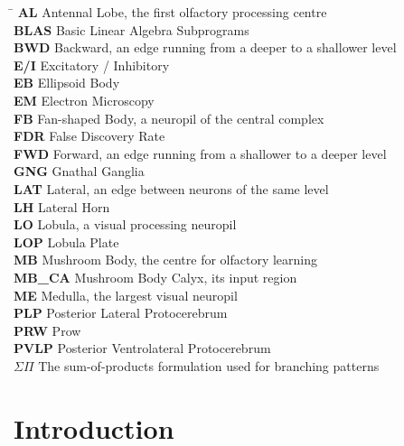 \documentclass[12pt,a4paper,oneside]{article}
\theoremstyle{definition}
\theoremstyle{plain}
\newcommand{\sigmapi}{\ensuremath{\Sigma\Pi}}
\begin{document}
\begin{tabbing}
\hspace{2.5cm}\= \kill
\textbf{AL}      \> Antennal Lobe, the first olfactory processing centre \\
\textbf{BLAS}    \> Basic Linear Algebra Subprograms \\
\textbf{BWD}     \> Backward, an edge running from a deeper to a shallower level \\
\textbf{E/I}     \> Excitatory / Inhibitory \\
\textbf{EB}      \> Ellipsoid Body \\
\textbf{EM}      \> Electron Microscopy \\
\textbf{FB}      \> Fan-shaped Body, a neuropil of the central complex \\
\textbf{FDR}     \> False Discovery Rate \\
\textbf{FWD}     \> Forward, an edge running from a shallower to a deeper level \\
\textbf{GNG}     \> Gnathal Ganglia \\
\textbf{LAT}     \> Lateral, an edge between neurons of the same level \\
\textbf{LH}      \> Lateral Horn \\
\textbf{LO}      \> Lobula, a visual processing neuropil \\
\textbf{LOP}     \> Lobula Plate \\
\textbf{MB}      \> Mushroom Body, the centre for olfactory learning \\
\textbf{MB\_CA}  \> Mushroom Body Calyx, its input region \\
\textbf{ME}      \> Medulla, the largest visual neuropil \\
\textbf{PLP}     \> Posterior Lateral Protocerebrum \\
\textbf{PRW}     \> Prow \\
\textbf{PVLP}    \> Posterior Ventrolateral Protocerebrum \\
\textbf{\sigmapi{}} \> The sum-of-products formulation used for branching patterns \\
\end{tabbing}

\clearpage
{}

\section{Introduction}
\label{sec:introduction}
\end{document}
